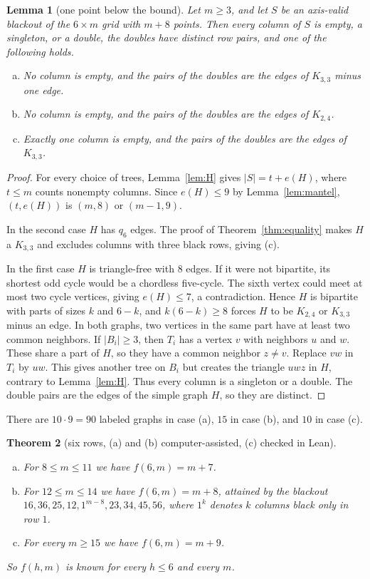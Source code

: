 \documentclass[12pt]{article}
\theoremstyle{plain}
\newtheorem{theorem}{Theorem}
\newtheorem{lemma}[theorem]{Lemma}
\theoremstyle{definition}
\theoremstyle{remark}
\begin{document}
\begin{lemma}[one point below the bound]\label{lem:sixbelow}
Let $m\ge3$, and let $S$ be an axis-valid blackout of the $6\times m$ grid with $m+8$ points.
Then every column of $S$ is empty, a singleton, or a double, the doubles have distinct row
pairs, and one of the following holds.
\begin{enumerate}[(a)]
\item No column is empty, and the pairs of the doubles are the edges of $K_{3,3}$ minus one edge.
\item No column is empty, and the pairs of the doubles are the edges of $K_{2,4}$.
\item Exactly one column is empty, and the pairs of the doubles are the edges of $K_{3,3}$.
\end{enumerate}
\end{lemma}

\begin{proof}
For every choice of trees, Lemma~\ref{lem:H} gives $|S|=t+e(H)$,
where $t\le m$ counts nonempty columns. Since $e(H)\le9$ by
Lemma~\ref{lem:mantel}, $(t,e(H))$ is $(m,8)$ or $(m-1,9)$.

In the second case $H$ has $q_6$ edges. The proof of Theorem~\ref{thm:equality}
makes $H$ a $K_{3,3}$ and excludes columns with three black rows, giving (c).

In the first case $H$ is triangle-free with $8$ edges. If it were not bipartite,
its shortest odd cycle would be a chordless five-cycle. The sixth vertex could meet
at most two cycle vertices, giving $e(H)\le7$, a contradiction. Hence $H$ is bipartite with parts of sizes
$k$ and $6-k$, and $k(6-k)\ge8$ forces $H$ to be $K_{2,4}$ or $K_{3,3}$ minus an edge. In both
graphs, two vertices in the same part have at least two common neighbors.
If $|B_i|\ge3$, then $T_i$ has a vertex $v$ with neighbors $u$ and $w$.
These share a part of $H$, so they have a common neighbor $z\ne v$.
Replace $vw$ in $T_i$ by $uw$. This gives another tree on $B_i$ but creates
the triangle $uwz$ in $H$, contrary to Lemma~\ref{lem:H}.
Thus every column is a singleton or a double. The double pairs are the edges
of the simple graph $H$, so they are distinct.
\end{proof}

There are $10\cdot9=90$ labeled graphs in case (a), $15$ in case (b), and $10$ in case (c).

\begin{theorem}[six rows, (a) and (b) computer-assisted, (c) checked in Lean]\label{thm:sixrow}
\leavevmode
\begin{enumerate}[(a)]
\item For $8\le m\le11$ we have $f(6,m)=m+7$.
\item For $12\le m\le14$ we have $f(6,m)=m+8$, attained by the blackout
$16,\allowbreak 36,\allowbreak 25,\allowbreak 12,\allowbreak 1^{m-8},\allowbreak 23,\allowbreak 34,\allowbreak 45,\allowbreak 56$, where $1^{k}$ denotes $k$
columns black only in row $1$.
\item For every $m\ge15$ we have $f(6,m)=m+9$.
\end{enumerate}
So $f(h,m)$ is known for every $h\le6$ and every $m$.
\end{theorem}
\end{document}
